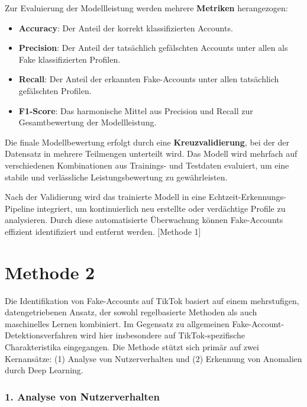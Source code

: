 \documentclass[12pt]{report}
\begin{document}
Zur Evaluierung der Modellleistung werden mehrere \textbf{Metriken} herangezogen:

\begin{itemize}[noitemsep, leftmargin=*, labelsep=1em]
	\item \textbf{Accuracy}: Der Anteil der korrekt klassifizierten Accounts.
	\item \textbf{Precision}: Der Anteil der tatsächlich gefälschten Accounts unter allen als Fake klassifizierten Profilen.
	\item \textbf{Recall}: Der Anteil der erkannten Fake-Accounts unter allen tatsächlich gefälschten Profilen.
	\item \textbf{F1-Score}: Das harmonische Mittel aus Precision und Recall zur Gesamtbewertung der Modellleistung.
\end{itemize}

Die finale Modellbewertung erfolgt durch eine \textbf{Kreuzvalidierung}, bei der der Datensatz in mehrere Teilmengen unterteilt wird. Das Modell wird mehrfach auf verschiedenen Kombinationen aus Trainings- und Testdaten evaluiert, um eine stabile und verlässliche Leistungsbewertung zu gewährleisten.

Nach der Validierung wird das trainierte Modell in eine Echtzeit-Erkennungs-Pipeline integriert, um kontinuierlich neu erstellte oder verdächtige Profile zu analysieren. Durch diese automatisierte Überwachung können Fake-Accounts effizient identifiziert und entfernt werden. [Methode 1]

\section{Methode 2}

Die Identifikation von Fake-Accounts auf TikTok basiert auf einem mehrstufigen, datengetriebenen Ansatz, der sowohl regelbasierte Methoden als auch maschinelles Lernen kombiniert. Im Gegensatz zu allgemeinen Fake-Account-Detektionsverfahren wird hier insbesondere auf TikTok-spezifische Charakteristika eingegangen. Die Methode stützt sich primär auf zwei Kernansätze: (1) Analyse von Nutzerverhalten und (2) Erkennung von Anomalien durch Deep Learning.

\subsubsection{1. Analyse von Nutzerverhalten}
\end{document}
